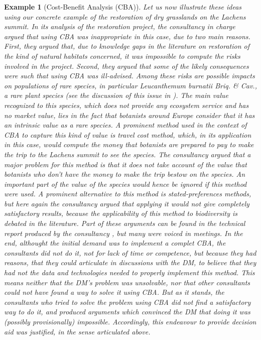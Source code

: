\documentclass[preprint, french, english, 11pt, authoryear]{elsarticle}%
\newtheorem{example}{Example}
\begin{document}
\begin{example}[Cost-Benefit Analysis (CBA)]
Let us now illustrate these ideas using our concrete example of the restoration of dry grasslands on the Lachens summit. In its analysis of the restoration project, the consultancy in charge argued that using CBA was inappropriate in this case, due to two main reasons. First, they argued that, due to knowledge gaps in the literature on restoration of the kind of natural habitats concerned, it was impossible to compute the risks involved in the project. Second, they argued that some of the likely consequences were such that using CBA was ill-advised. Among these risks are possible impacts on populations of rare species, in particular \emph{Leucanthemum burnatii} Briq. \& Cav., a rare plant species (see the discussion of this issue in \cite{meinard_ethical_2016}). The main value recognized to this species, which does not provide any ecosystem service and has no market value, lies in the fact that botanists around Europe consider that it has an intrinsic value as a rare species. A prominent method used in the context of CBA to capture this kind of value is travel cost method, which, in its application in this case, would compute the money that botanists are prepared to pay to make the trip to the Lachens summit to see the species. The consultancy argued that a major problem for this method is that it does not take account of the value that botanists who don't have the money to make the trip bestow on the species. An important part of the value of the species would hence be ignored if this method were used. A prominent alternative to this method is stated-preferences methods, but here again the consultancy argued that applying it would not give completely satisfactory results, because the applicability of this method to biodiversity is debated in the literature. Part of these arguments can be found in the technical report produced by the consultancy \citep{meinard_etude_2015}, but many were voiced in meetings. In the end, althought the initial demand was to implement a complet CBA, the consultants did not do it, not for lack of time or competence, but because they had reasons, that they could articulate in discussions with the \ac{DM}, to believe that they had not the data and technologies needed to properly implement this method. This means neither that the \ac{DM}'s problem was unsolvable, nor that other consultants could not have found a way to solve it using CBA. But as it stands, the consultants who tried to solve the problem using CBA did not find a satisfactory way to do it, and produced arguments which convinced the \ac{DM} that doing it was (possibly provisionally) impossible. Accordingly, this endeavour to provide decision aid was justified, in the sense articulated above.
\end{example}
\end{document}
